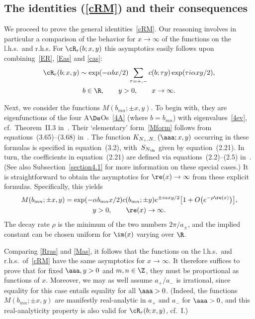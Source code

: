 \documentclass[pdftex]{sigma}
\numberwithin{equation}{section}
\begin{document}
\subsection{The identities (\ref{cRM}) and their consequences}\label{section2.3}

We proceed to prove the general identities~\eqref{cRM}.
Our reasoning involves in particular a comparison of the behavior for $x\to\infty$ of the functions on the l.h.s.\ and r.h.s. For $\cR_r(b;x,y)$ this asymptotics easily follows upon combining~\eqref{ER}, \eqref{Eas} and \eqref{cas}:
\begin{gather}\label{Rras}
\cR_r(b;x,y)\sim \exp(-\alpha bx/2)\sum_{\tau=+,-}c(b;\tau y)\exp(\tau i\alpha xy/2),\\
 b\in\R,\qquad y>0,\qquad x\to\infty.\nonumber
\end{gather}

{\sloppy Next, we consider the functions $M(b_{mn};\pm x,y)$. To begin with, they are eigenfunctions of the four A$\De$Os~\eqref{4A} (where $b=b_{mn}$) with eigenvalues~\eqref{4ev}, cf.~Theorem~II.3 in~\cite{GLFII}. Their `ele\-men\-ta\-ry' form~\eqref{Mform} follows from equations~(3.65)--(3.68) in~\cite{GLFII}. The function $K_{N_{+},N_{-}}(\aaa;x,y)$ occurring in these formulas is specif\/ied in equation~(3.2), with~$S_{N_{\de}}$ given by equation~(2.21). In turn, the coef\/f\/icients in equation~(2.21) are def\/ined via equations~(2.2)--(2.5) in~\cite{GLFII}. (See also Subsection~\ref{section4.1} for more information on these special cases.) It is straightforward to obtain the asymptotics for $\re(x)\to \infty$ from these explicit formulas. Specif\/ically, this yields
\begin{gather}\label{Mas}
M(b_{mn};\pm x,y)=\exp (- \alpha b_{mn}x/2)c(b_{mn};\pm y)e^{ \pm i\alpha xy/2}\big[1+O\big(e^{-\rho \re(x)}\big)\big],\\
 y>0,\qquad \re(x)\to \infty.\nonumber
\end{gather}
The decay rate $\rho$ is the minimum of the two numbers $2\pi /a_{\pm}$, and the implied constant can be chosen uniform for $\im (x)$ varying over $\R$.

}

Comparing \eqref{Rras} and \eqref{Mas}, it follows that the functions on the l.h.s.\ and r.h.s.\ of~\eqref{cRM} have the same asymptotics for $x\to \infty$. It therefore suf\/f\/ices to prove that for f\/ixed $\aaa,y>0$ and $m,n\in\Z$, they must be proportional as functions of $x$. Moreover, we may as well assume $a_{+}/a_{-}$ is irrational, since equality for this case entails equality for all $\aaa>0$. (Indeed, the functions $M(b_{mn};\pm x,y)$ are manifestly real-analytic in $a_{+}$ and $a_{-}$ for $\aaa >0$, and this real-analyticity property is also valid for $\cR_r(b;x,y)$, cf.~I.)
\end{document}
